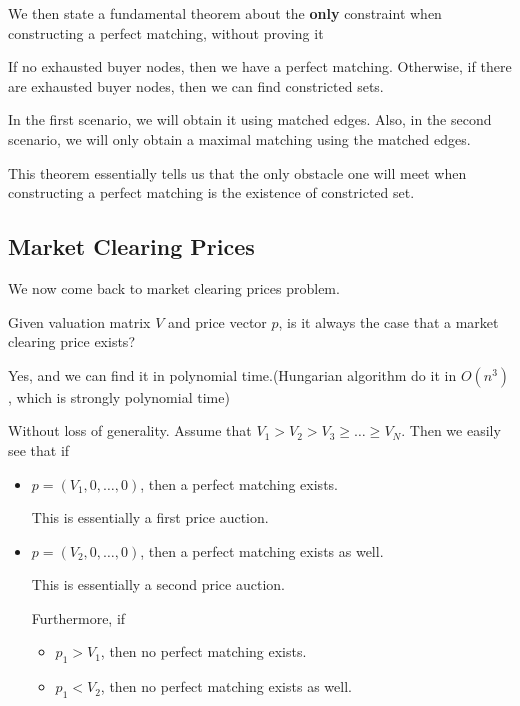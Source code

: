 We then state a fundamental theorem about the \textbf{only} constraint when constructing a perfect matching, without proving it
\begin{theorem}
	If no exhausted buyer nodes, then we have a perfect matching. Otherwise, if there are exhausted buyer nodes, then we
	can find constricted sets.
\end{theorem}
\begin{note}
	In the first scenario, we will obtain it using matched edges. Also, in the second scenario, we will only obtain a maximal matching
	using the matched edges.
\end{note}

\begin{remark}
	This theorem essentially tells us that the only obstacle one will meet when constructing a perfect matching is the existence of
	constricted set.
\end{remark}

\subsection{Market Clearing Prices}
We now come back to market clearing prices problem.

\begin{problem}
Given valuation matrix \(V\) and price vector \(p\), is it always the case that a market clearing price exists?
\end{problem}

\begin{answer}
	Yes, and we can find it in polynomial time.(Hungarian algorithm do it in \(O(n^{3})\), which is strongly polynomial time)
\end{answer}

Without loss of generality. Assume that \(V_{1}>V_{2}>V_{3}\geq \ldots \geq V_{N}\). Then we easily see that if
\begin{itemize}
	\item \(p = (V_{1}, 0, \ldots , 0 )\), then a perfect matching exists.
	      \begin{note}
		      This is essentially a first price auction.
	      \end{note}
	\item \(p = (V_{2}, 0, \ldots , 0 )\), then a perfect matching exists as well.
	      \begin{note}
		      This is essentially a second price auction.
	      \end{note}
	      Furthermore, if
	      \begin{itemize}
		      \item \(p_{1}>V_{1}\), then no perfect matching exists.
		      \item \(p_{1}<V_{2}\), then no perfect matching exists as well.
	      \end{itemize}
\end{itemize}

